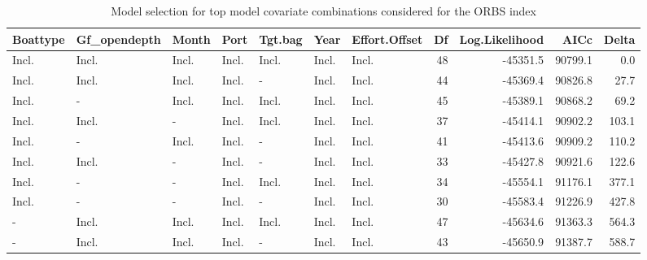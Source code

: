 \documentclass[
]{scrartcl}
\begin{document}
\begin{landscape}
\begingroup
\fontsize{9.0pt}{10.8pt}\selectfont

\begin{longtable}{lllllllrrrr}

\caption{\label{tbl-yelloweye_model_selection_ORBS}Model selection for
top model covariate combinations considered for the ORBS index}

\tabularnewline

\toprule
Boattype & Gf\_opendepth & Month & Port & Tgt.bag & Year & Effort.Offset & Df & Log.Likelihood & AICc & Delta \\ 
\midrule\addlinespace[2.5pt]
Incl. & Incl. & Incl. & Incl. & Incl. & Incl. & Incl. & 48 & -45351.5 & 90799.1 & 0.0 \\ 
Incl. & Incl. & Incl. & Incl. & - & Incl. & Incl. & 44 & -45369.4 & 90826.8 & 27.7 \\ 
Incl. & - & Incl. & Incl. & Incl. & Incl. & Incl. & 45 & -45389.1 & 90868.2 & 69.2 \\ 
Incl. & Incl. & - & Incl. & Incl. & Incl. & Incl. & 37 & -45414.1 & 90902.2 & 103.1 \\ 
Incl. & - & Incl. & Incl. & - & Incl. & Incl. & 41 & -45413.6 & 90909.2 & 110.2 \\ 
Incl. & Incl. & - & Incl. & - & Incl. & Incl. & 33 & -45427.8 & 90921.6 & 122.6 \\ 
Incl. & - & - & Incl. & Incl. & Incl. & Incl. & 34 & -45554.1 & 91176.1 & 377.1 \\ 
Incl. & - & - & Incl. & - & Incl. & Incl. & 30 & -45583.4 & 91226.9 & 427.8 \\ 
- & Incl. & Incl. & Incl. & Incl. & Incl. & Incl. & 47 & -45634.6 & 91363.3 & 564.3 \\ 
- & Incl. & Incl. & Incl. & - & Incl. & Incl. & 43 & -45650.9 & 91387.7 & 588.7 \\ 
\bottomrule

\end{longtable}

\endgroup

\end{landscape}

\newpage{}

\begingroup
\fontsize{9.0pt}{10.8pt}\selectfont
\end{document}
